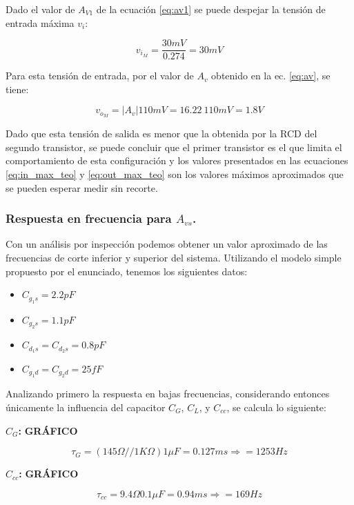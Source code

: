 \documentclass[a4paper, 10pt, spanish]{article}
\begin{document}
Dado el valor de $A_{V1}$ de la ecuación \ref{eq:av1} se puede despejar la tensión de entrada máxima $v_i$:

\begin{equation}
  v_{i_M}=\frac{30mV}{0.274}=30mV
  \label{eq:in_max_teo}
\end{equation}

Para esta tensión de entrada, por el valor de $A_v$ obtenido en la ec. \ref{eq:av}, se tiene:

\begin{equation}
  v_{o_M}=|A_v|110mV=16.22\ 110mV = 1.8V
  \label{eq:out_max_teo}
\end{equation}

Dado que esta tensión de salida es menor que la obtenida por la RCD del segundo transistor, se puede concluir que el primer transistor es el que limita el comportamiento de esta configuración y los valores presentados en las ecuaciones \ref{eq:in_max_teo} y \ref{eq:out_max_teo} son los valores máximos aproximados que se pueden esperar medir sin recorte.


\subsubsection{Respuesta en frecuencia para $A_{vs}$.}
Con un análisis por inspección podemos obtener un valor aproximado de las frecuencias de corte inferior y superior del sistema. Utilizando el modelo simple propuesto por el enunciado, tenemos los siguientes datos:
\begin{itemize}
  \item $C_{g_1s} = 2.2pF$
  \item $C_{g_2s} = 1.1pF$
  \item $C_{d_1s} = C_{d_2s} = 0.8pF$
  \item $C_{g_1d} = C_{g_2d} = 25fF$
\end{itemize}

Analizando primero la respuesta en bajas frecuencias, considerando entonces únicamente la influencia del capacitor $C_G$, $C_L$, y $C_{cc}$, se calcula lo siguiente:

\textbf{$C_G$:}
\textbf{GRÁFICO}

\begin{equation}
  \tau_G = (145\Omega//1K\Omega) 1\mu F = 0.127ms \Rightarrow = 1253 Hz
\end{equation}

\textbf{$C_{cc}$:}
\textbf{GRÁFICO}

\begin{equation}
  \tau_{cc} = 9.4\Omega 0.1\mu F = 0.94ms \Rightarrow = 169 Hz
\end{equation}
\end{document}
